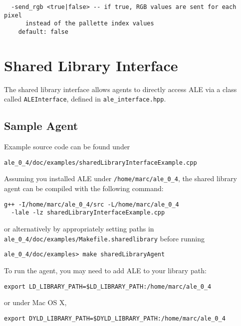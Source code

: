 \documentclass[12pt]{article}
\begin{document}
\small{
\begin{verbatim}
  -send_rgb <true|false> -- if true, RGB values are sent for each pixel
      instead of the pallette index values
    default: false
\end{verbatim}
}

\section{Shared Library Interface}\label{sec:shared_library_interface}

The shared library interface allows agents to directly access ALE via a class called
\verb+ALEInterface+, defined in \verb+ale_interface.hpp+. 

\subsection{Sample Agent}

Example source code can be found under

\begin{verbatim}
ale_0_4/doc/examples/sharedLibraryInterfaceExample.cpp
\end{verbatim}

Assuming you installed ALE under \verb+/home/marc/ale_0_4+, the shared library agent can be 
compiled with the following command: 

\begin{verbatim}
g++ -I/home/marc/ale_0_4/src -L/home/marc/ale_0_4 
  -lale -lz sharedLibraryInterfaceExample.cpp 
\end{verbatim}

or alternatively by appropriately setting paths in \verb+ale_0_4/doc/examples/Makefile.sharedlibrary+ before running 

\begin{verbatim}
ale_0_4/doc/examples> make sharedLibraryAgent
\end{verbatim}

To run the agent, you may need to add ALE to your library path:

\begin{verbatim}
export LD_LIBRARY_PATH=$LD_LIBRARY_PATH:/home/marc/ale_0_4
\end{verbatim}

or under Mac OS X,

\begin{verbatim}
export DYLD_LIBRARY_PATH=$DYLD_LIBRARY_PATH:/home/marc/ale_0_4
\end{verbatim}
\end{document}
